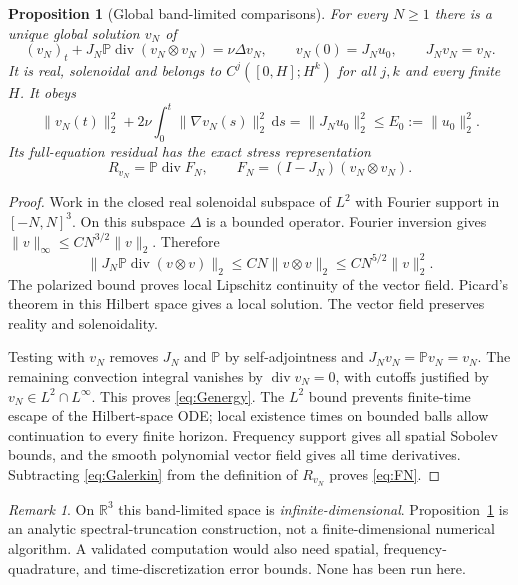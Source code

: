 \documentclass[11pt,a4paper]{article}
\newtheorem{proposition}[theorem]{Proposition}
\theoremstyle{definition}\newtheorem{definition}[theorem]{Definition}
\theoremstyle{remark}\newtheorem{remark}[theorem]{Remark}
\newcommand{\R}{\mathbb R}
\newcommand{\PP}{\mathbb P}
\newcommand{\dd}{\,\mathrm d}
\newcommand{\norm}[1]{\lVert #1\rVert}
\newcommand{\diver}{\operatorname{div}}
\numberwithin{equation}{section}
\begin{document}
\begin{proposition}[Global band-limited comparisons]\label{prop:Galerkin}
For every $N\ge1$ there is a unique global solution $v_N$ of
\begin{equation}\label{eq:Galerkin}
 (v_N)_t+J_N\PP\diver(v_N\otimes v_N)=\nu\Delta v_N,
 \qquad v_N(0)=J_Nu_0,\qquad J_Nv_N=v_N.
\end{equation}
It is real, solenoidal and belongs to $C^j([0,H];H^k)$ for all $j,k$ and every finite $H$. It obeys
\begin{equation}\label{eq:Genergy}
 \norm{v_N(t)}_2^2+2\nu\int_0^t\norm{\nabla v_N(s)}_2^2\dd s
 =\norm{J_Nu_0}_2^2\le E_0:=\norm{u_0}_2^2.
\end{equation}
Its full-equation residual has the exact stress representation
\begin{equation}\label{eq:FN}
 R_{v_N}=\PP\diver F_N,
 \qquad F_N=(I-J_N)(v_N\otimes v_N).
\end{equation}
\end{proposition}
\begin{proof}
Work in the closed real solenoidal subspace of $L^2$ with Fourier support in $[-N,N]^3$. On this subspace $\Delta$ is a bounded operator. Fourier inversion gives $\norm v_\infty\le C N^{3/2}\norm v_2$. Therefore
\[
 \norm{J_N\PP\diver(v\otimes v)}_2
 \le C N\norm{v\otimes v}_2
 \le C N^{5/2}\norm v_2^2.
\]
The polarized bound proves local Lipschitz continuity of the vector field. Picard's theorem in this Hilbert space gives a local solution. The vector field preserves reality and solenoidality.

Testing with $v_N$ removes $J_N$ and $\PP$ by self-adjointness and $J_Nv_N=\PP v_N=v_N$. The remaining convection integral vanishes by $\diver v_N=0$, with cutoffs justified by $v_N\in L^2\cap L^\infty$. This proves \eqref{eq:Genergy}. The $L^2$ bound prevents finite-time escape of the Hilbert-space ODE; local existence times on bounded balls allow continuation to every finite horizon. Frequency support gives all spatial Sobolev bounds, and the smooth polynomial vector field gives all time derivatives. Subtracting \eqref{eq:Galerkin} from the definition of $R_{v_N}$ proves \eqref{eq:FN}.
\end{proof}

\begin{remark}
On $\R^3$ this band-limited space is \emph{infinite-dimensional}. Proposition~\ref{prop:Galerkin} is an analytic spectral-truncation construction, not a finite-dimensional numerical algorithm. A validated computation would also need spatial, frequency-quadrature, and time-discretization error bounds. None has been run here.
\end{remark}
\end{document}
